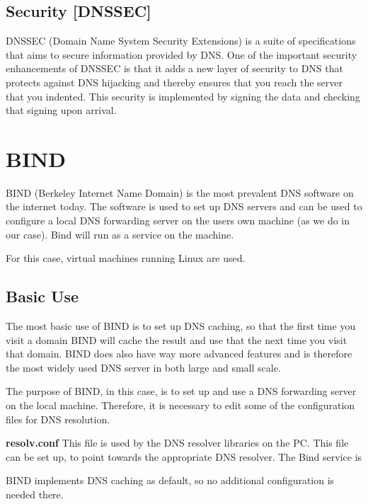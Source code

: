 \subsection{Security [DNSSEC]}
DNSSEC (Domain Name System Security Extensions) is a suite of specifications that aims to secure information provided by DNS. One of the important security enhancements of DNSSEC is that it adds a new layer of security to DNS that protects against DNS hijacking and thereby ensures that you reach the server that you indented. This security is implemented by signing the data and checking that signing upon arrival.

\section{BIND}
BIND (Berkeley Internet Name Domain) is the most prevalent DNS software on the internet today. The software is used to set up DNS servers and can be used to configure a local DNS forwarding server on the users own machine (as we do in our case).
Bind will run as a service on the machine. 

For this case, virtual machines running Linux are used. 


\subsection{Basic Use}
The most basic use of BIND is to set up DNS caching, so that the first time you visit a domain BIND will cache the result and use that the next time you visit that domain.
BIND does also have way more advanced features and is therefore the most widely used DNS server in both large and small scale.

The purpose of BIND, in this case, is to set up and use a DNS forwarding server on the local machine. 
Therefore, it is necessary to edit some of the configuration files for DNS resolution.

\textbf{resolv.conf}
This file is used by the DNS resolver libraries on the PC. This file can be set up, to point towards the appropriate DNS resolver. The Bind service is 

BIND implements DNS caching as default, so no additional configuration is needed there. 


